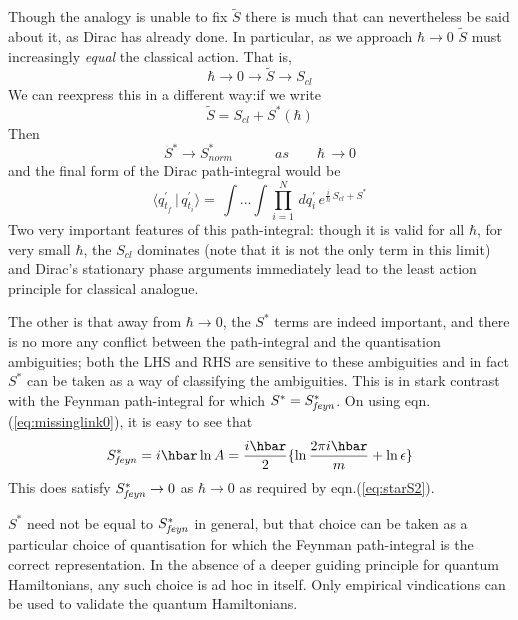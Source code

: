 \documentclass[12pt]{article}
\newcommand{\be}{\begin{equation}}
\newcommand{\ee}{\end{equation}}
\begin{document}
Though the analogy is unable to fix ${\tilde S}$ there is much that can nevertheless be said about it, as Dirac has already done. In 
particular, as we approach $\hbar \rightarrow 0$ ${\tilde S}$ must increasingly {\it equal} the classical action.  That is,
\be
\label{eq:tildeS}
\hbar \rightarrow 0 \rightarrow {\tilde S} \rightarrow S_{cl}
\ee
We can reexpress this in a different way:if we write
\be
\label{eq:starS}
{\tilde S} = S_{cl} + S^*(\hbar)
\ee
Then 
\be
\label{eq:starS2}
S^* \rightarrow  S^*_{norm} \quad\quad\quad as\quad\quad \hbar\,\rightarrow 0
\ee
and the final form of the Dirac path-integral would be
\be
\label{eq:diracpathint*}
\langle q_{t_f}^\prime\,|\,q_{t_i}^\prime \rangle  =
\, \int \ldots \int \prod_{i=1}^{N}\,dq_i^\prime\,e^{\frac{i}{\hbar}\,S_{cl} + S^*}
\ee 
Two very important features of this path-integral: though it is valid for all $\hbar$, for very small $\hbar$, the $S_{cl}$ dominates (note
that it is not the only term in this limit) and Dirac's stationary phase arguments immediately lead to the least action principle for classical
analogue.

The other is that away from $\hbar \rightarrow 0$, the $S^*$ terms are indeed important, and there is no more any conflict between the
path-integral and the quantisation ambiguities; both the LHS and RHS are sensitive to these ambiguities and in fact $S^*$ can be taken as a
way of classifying the ambiguities. This is in stark contrast with the Feynman path-integral for which $S^* = S^*_{\it feyn}$. On using
eqn.(\ref{eq:missinglink0}), it is easy to see that
\be
\label{eq:S*feyn} 
S^*_{\it feyn} = i \hbar \ln{A}=\frac{i\hbar}{2}\{ \ln{\frac{2 \pi i \hbar}{m}} + \ln{\epsilon}\}
\ee
This does satisfy $S^*_{\it feyn} \rightarrow 0$ as $\hbar \rightarrow 0$ as required by eqn.(\ref{eq:starS2}).

$S^*$ need not be equal to $S^*_{\it feyn}$ in general, but that choice can be taken as a particular choice of quantisation for which the 
Feynman path-integral is the
correct representation. In the absence of a deeper guiding principle for quantum Hamiltonians, any such choice is ad hoc in itself.
Only empirical vindications can be used to validate the quantum Hamiltonians.
\end{document}
